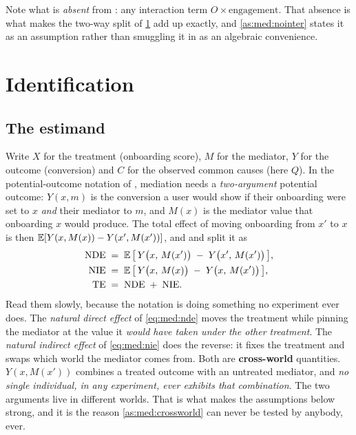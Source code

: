 Note what is \emph{absent} from : any interaction term
$O \times \text{engagement}$. That absence is what makes the two-way split of
\cref{sec:med:ident} add up exactly, and \cref{as:med:nointer} states it as an assumption rather
than smuggling it in as an algebraic convenience.



\section{Identification}
\label{sec:med:ident}

\subsection*{The estimand}

Write $X$ for the treatment (onboarding score), $M$ for the mediator, $Y$ for the outcome
(conversion) and $C$ for the observed common causes (here $Q$). In the potential-outcome notation
of \citet{rubin1974}, mediation needs a \emph{two-argument} potential outcome: $Y(x, m)$ is the
conversion a user would show if their onboarding were set to $x$ \emph{and} their mediator to $m$,
and $M(x)$ is the mediator value that onboarding $x$ would produce. The total effect of moving
onboarding from $x'$ to $x$ is then $\operatorname{\mathbb{E}}[Y(x, M(x)) - Y(x', M(x'))]$, and \citet{pearl2001} and
\citet{robins1992} split it as
%
\begin{align}
  \text{NDE} &\;=\; \operatorname{\mathbb{E}}\big[\,Y\big(x,\,M(x')\big) \;-\; Y\big(x',\,M(x')\big)\,\big],
    \label{eq:med:nde}\\
  \text{NIE} &\;=\; \operatorname{\mathbb{E}}\big[\,Y\big(x,\,M(x)\big) \;-\; Y\big(x,\,M(x')\big)\,\big],
    \label{eq:med:nie}\\
  \text{TE}  &\;=\; \text{NDE} \;+\; \text{NIE}. \label{eq:med:te}
\end{align}
%
Read them slowly, because the notation is doing something no experiment ever does. The
\emph{natural direct effect} of \cref{eq:med:nde} moves the treatment while pinning the mediator at
the value it \emph{would have taken under the other treatment}. The \emph{natural indirect effect}
of \cref{eq:med:nie} does the reverse: it fixes the treatment and swaps which world the mediator
comes from. Both are \textbf{cross-world} quantities. $Y(x, M(x'))$ combines a treated outcome with
an untreated mediator, and \emph{no single individual, in any experiment, ever exhibits that
combination}. The two arguments live in different worlds. That is what makes the assumptions below
strong, and it is the reason \cref{as:med:crossworld} can never be tested by anybody, ever.

